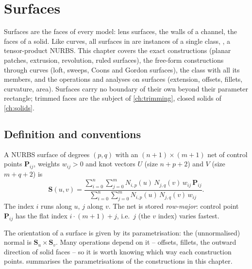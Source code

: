 \chapter{Surfaces}\label{ch:surfaces}

Surfaces are the faces of every model: lens surfaces, the walls of a channel, the faces of a
solid. Like curves, all surfaces in \NF{} are instances of a single class,
, a tensor-product NURBS. This chapter covers the exact constructions
(planar patches, extrusion, revolution, ruled surfaces), the free-form constructions through
curves (loft, sweeps, Coons and Gordon surfaces), the  class with all its
members, and the operations and analyses on surfaces (extension, offsets, fillets, curvature,
area). Surfaces carry no boundary of their own beyond their parameter rectangle; trimmed faces
are the subject of \cref{ch:trimming}, closed solids of \cref{ch:solids}.

\section{Definition and conventions}\label{sec:surface-def}

A NURBS surface of degrees $(p, q)$ with an $(n+1)\times(m+1)$ net of control points $\mathbf
P_{ij}$, weights $w_{ij} > 0$ and knot vectors $U$ (size $n+p+2$) and $V$ (size $m+q+2$) is
\[
  \mathbf S(u,v) = \frac{\sum_{i=0}^{n}\sum_{j=0}^{m} N_{i,p}(u)\,N_{j,q}(v)\,w_{ij}\,\mathbf P_{ij}}
                        {\sum_{i=0}^{n}\sum_{j=0}^{m} N_{i,p}(u)\,N_{j,q}(v)\,w_{ij}} .
\]
The index $i$ runs along $u$, $j$ along $v$. The net is stored \emph{row-major}: control point
$\mathbf P_{ij}$ has the flat index $i\cdot(m+1)+j$, i.e.\ $j$ (the $v$ index) varies fastest.

The orientation of a surface is given by its parametrisation: the (unnormalised) normal is
$\mathbf S_u \times \mathbf S_v$. Many operations depend on it -- offsets, fillets, the outward
direction of solid faces -- so it is worth knowing which way each construction points.
 summarises the parametrisations of the constructions in this chapter.


